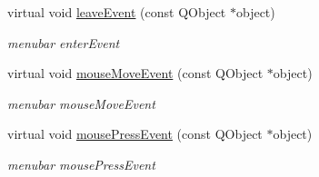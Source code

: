 \begin{DoxyCompactItemize}
\mbox{\label{class_menu_bar_data_v1_a4295a881fb82622a78e5327551b6d16c}} 
virtual void \hyperlink{class_menu_bar_data_v1_a4295a881fb82622a78e5327551b6d16c}{leave\+Event} (const Q\+Object $\ast$object)
\begin{DoxyCompactList}\small\item\em menubar enter\+Event \end{DoxyCompactList}\item 
\mbox{\label{class_menu_bar_data_v1_acc72518121a10b47e747576032bec91b}} 
virtual void \hyperlink{class_menu_bar_data_v1_acc72518121a10b47e747576032bec91b}{mouse\+Move\+Event} (const Q\+Object $\ast$object)
\begin{DoxyCompactList}\small\item\em menubar mouse\+Move\+Event \end{DoxyCompactList}\item 
\mbox{\label{class_menu_bar_data_v1_a9b40937602c6c70933a11d351244a899}} 
virtual void \hyperlink{class_menu_bar_data_v1_a9b40937602c6c70933a11d351244a899}{mouse\+Press\+Event} (const Q\+Object $\ast$object)
\begin{DoxyCompactList}\small\item\em menubar mouse\+Press\+Event \end{DoxyCompactList}\end{DoxyCompactItemize}
